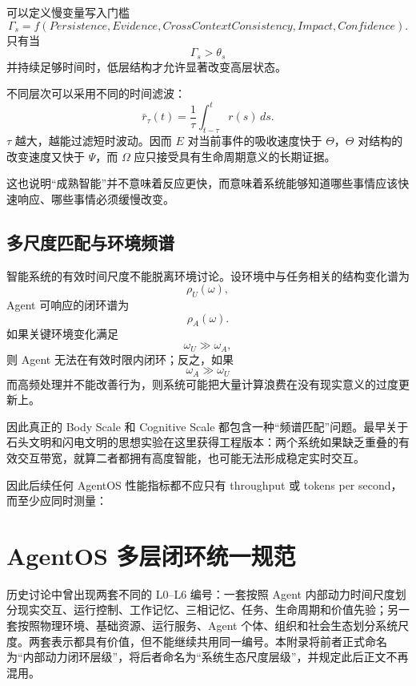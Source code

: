 可以定义慢变量写入门槛
\[
\Gamma_s
=
f(
Persistence,
Evidence,
CrossContextConsistency,
Impact,
Confidence
).
\]
只有当
\[
\Gamma_s>\theta_s
\]
并持续足够时间时，低层结构才允许显著改变高层状态。

不同层次可以采用不同的时间滤波：
\[
\bar r_{\tau}(t)
=
\frac{1}{\tau}
\int_{t-\tau}^{t}
r(s)\,ds.
\]
$\tau$ 越大，越能过滤短时波动。因而 $E$ 对当前事件的吸收速度快于 $\Theta$，$\Theta$ 对结构的改变速度又快于 $\Psi$，而 $\Omega$ 应只接受具有生命周期意义的长期证据。

这也说明“成熟智能”并不意味着反应更快，而意味着系统能够知道哪些事情应该快速响应、哪些事情必须缓慢改变。

\section{多尺度匹配与环境频谱}

智能系统的有效时间尺度不能脱离环境讨论。设环境中与任务相关的结构变化谱为
\[
\rho_U(\omega),
\]
Agent 可响应的闭环谱为
\[
\rho_A(\omega).
\]
如果关键环境变化满足
\[
\omega_U\gg\omega_A,
\]
则 Agent 无法在有效时限内闭环；反之，如果
\[
\omega_A\gg\omega_U
\]
而高频处理并不能改善行为，则系统可能把大量计算浪费在没有现实意义的过度更新上。

因此真正的 Body Scale 和 Cognitive Scale 都包含一种“频谱匹配”问题。最早关于石头文明和闪电文明的思想实验在这里获得工程版本：两个系统如果缺乏重叠的有效交互带宽，就算二者都拥有高度智能，也可能无法形成稳定实时交互。

因此后续任何 AgentOS 性能指标都不应只有 throughput 或 tokens per second，而至少应同时测量：
\begin{statementbox}
\centering
{}
\end{statementbox}


\chapter{AgentOS 多层闭环统一规范}
\label{app:loops}

\begin{chapterlead}
历史讨论中曾出现两套不同的 L0--L6 编号：一套按照 Agent 内部动力时间尺度划分现实交互、运行控制、工作记忆、三相记忆、任务、生命周期和价值先验；另一套按照物理环境、基础资源、运行服务、Agent 个体、组织和社会生态划分系统尺度。两套表示都具有价值，但不能继续共用同一编号。本附录将前者正式命名为“内部动力闭环层级”，将后者命名为“系统生态尺度层级”，并规定此后正文不再混用。
\end{chapterlead}

